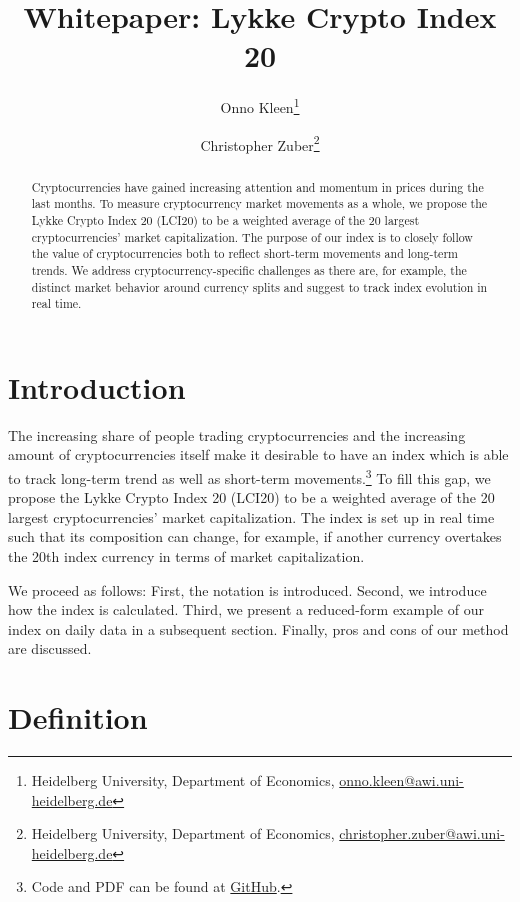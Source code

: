 \documentclass[11pt]{article}
\title{Whitepaper: Lykke Crypto Index 20}
\author{
Onno Kleen\thanks{Heidelberg University, Department of Economics, \href{mailto:onno.kleen@awi.uni-heidelberg.de}{onno.kleen@awi.uni-heidelberg.de}}
\and
Christopher Zuber\thanks{Heidelberg University, Department of Economics, \href{mailto:christopher.zuber@awi.uni-heidelberg.de}{christopher.zuber@awi.uni-heidelberg.de}}
}
\begin{document}
\maketitle

\begin{abstract}
    Cryptocurrencies have gained increasing attention and momentum in prices during the last months.
    To measure cryptocurrency market movements as a whole, we propose the Lykke Crypto Index 20 (LCI20) to be a weighted average of the 20 largest cryptocurrencies' market capitalization.
    The purpose of our index is to closely follow the value of cryptocurrencies both to reflect short-term movements and long-term trends.
    We address cryptocurrency-specific challenges as there are, for example, the distinct market behavior around currency splits and suggest to track index evolution in real time.
\end{abstract}


\section{Introduction}

The increasing share of people trading cryptocurrencies and the increasing amount of cryptocurrencies itself make it desirable to have an index which is able to track long-term trend as well as short-term movements.\footnote{Code and PDF can be found at \href{https://github.com/onnokleen/crypto-index}{GitHub}.}
To fill this gap, we propose the Lykke Crypto Index 20 (LCI20) to be a weighted average of the 20 largest cryptocurrencies' market capitalization.
The index is set up in real time such that its composition can change, for example, if another currency overtakes the 20th index currency in terms of market capitalization.

We proceed as follows:
First, the notation is introduced.
Second, we introduce how the index is calculated.
Third, we present a reduced-form example of our index on daily data in a subsequent section.
Finally, pros and cons of our method are discussed.


\section{Definition}
\end{document}
